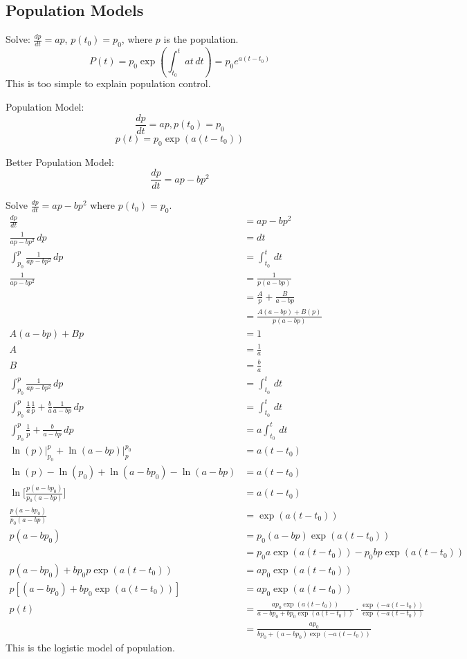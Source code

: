 \documentclass[12pt]{article}
\begin{document}
\subsection{Population Models} 
\begin{example} Solve: $\frac{dp}{dt} = ap$, $p(t_0) = p_0$, where $p$ is the population. 
$$ P(t) = p_0\exp(\int_{t_0}^t at \, dt) = p_0e^{a(t - t_0)}$$ This is too simple to explain population control. \end{example} 
\begin{definition} Population Model: $$\frac{dp}{dt} = ap, p(t_0) = p_0$$ $$ p(t) = p_0\exp(a(t - t_0))$$  \end{definition} 
\begin{definition} Better Population Model: $$\frac{dp}{dt} = ap - bp^2$$ \end{definition}
\begin{example} Solve $\frac{dp}{dt} = ap - bp^2$ where $p(t_0) = p_0$. $$\begin{aligned} 
\frac{dp}{dt} &= ap - bp^2 \\ \frac{1}{ap - bp^2}\, dp &= dt \\ \int_{p_0}^p \frac{1}{ap - bp^2} \, dp &= \int_{t_0}^t \, dt \\ \frac{1}{ap - bp^2} &= \frac{1}{p(a - bp)} \\ &= \frac{A}{p} + \frac{B}{a - bp} \\ &= \frac{A(a - bp) + B(p)}{p(a - bp)} \\ A(a - bp) + Bp &= 1 \\ A &= \frac{1}{a} \\ B &= \frac{b}{a} \\ \int_{p_0}^p \frac{1}{ap - bp^2} \, dp &= \int_{t_0}^t \, dt \\ \int_{p_0}^p \frac{1}{a}\frac{1}{p} + \frac{b}{a}\frac{1}{a - bp} \, dp &= \int_{t_0}^t \, dt \\ \int_{p_0}^p \frac{1}{p} + \frac{b}{a - bp} \, dp &= a\int_{t_0}^t \, dt \\ \ln(p)\Big|_{p_0}^p + \ln(a - bp)\Big|_p^{p_0} &= a(t - t_0) \\ \ln(p) - \ln(p_0) + \ln(a - bp_0) - \ln(a - bp) &= a(t - t_0) \\ \ln\Big[\frac{p(a - bp_0)}{p_0(a - bp)}\Big] &= a(t - t_0) \\ \frac{p(a - bp_0)}{p_0(a - bp)} &= \exp(a(t - t_0)) \\ p(a - bp_0) &= p_0(a - bp)\exp(a(t - t_0)) \\ &= p_0a\exp(a(t - t_0)) - p_0bp\exp(a(t - t_0)) \\ p(a - bp_0) + bp_0p\exp(a(t - t_0)) &= ap_0\exp(a(t - t_0)) \\ p[(a - bp_0) + bp_0\exp(a(t - t_0))] &= ap_0\exp(a(t - t_0)) \\ p(t) &= \frac{ap_0\exp(a(t - t_0))}{a - bp_0 + bp_0\exp(a(t - t_0))} \cdot \frac{\exp(-a(t - t_0))}{\exp(-a(t - t_0))} \\ &= \frac{ap_0}{bp_0 + (a - bp_0)\exp(-a(t - t_0))} \end{aligned} $$ This is the logistic model of population. \end{example} 
\end{document}
